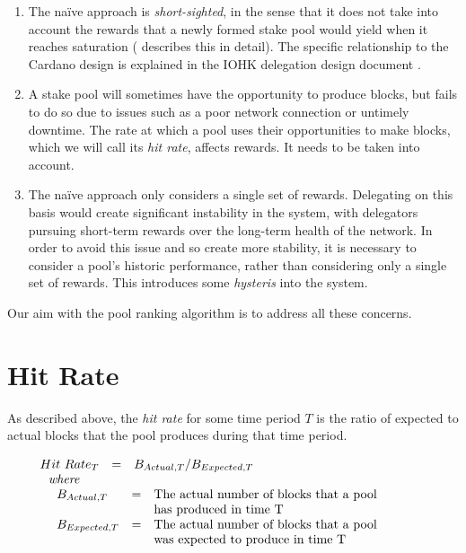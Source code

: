 \documentclass[11pt,a4paper,dvipsnames,twosided]{article}
\begin{document}
\begin{enumerate}
  \item
  The na\"{i}ve approach is \emph{short-sighted}, in the sense that it does not take into
  account the rewards that a newly formed stake pool would yield when it reaches saturation (\cite{bkks2018} describes this in detail).
  The specific relationship to the Cardano design is explained in the IOHK delegation design document \cite[Section 5.6]{delegation_design}.
  \item
    A stake pool will sometimes have the opportunity to produce blocks,
    but fails to do so due to issues such as a poor network connection or untimely downtime. The rate at
    which a pool uses their opportunities to make blocks, which we will call its \emph{hit rate}, affects rewards.
    It needs to be taken into account.
  \item
    The na\"{i}ve approach only considers a single set of rewards.  Delegating on this basis would create significant
    instability in the system, with delegators pursuing short-term rewards over the long-term health of the network.
    In order to avoid this issue and so create more stability, it is necessary to consider a pool's historic performance, rather than considering only a single set of rewards.
    This introduces some \emph{hysteris} into the system.
\end{enumerate}

Our aim with the pool ranking algorithm is to address all these concerns.

\begin{comment}
  Is this a new proposal, or just a description of the current status quo?
\end{comment}

\section{Hit Rate}

As described above, the \emph{hit rate} for some time period $T$ is the ratio of expected to actual blocks
that the pool produces during that time period.

$$
\begin{array}{l}
  \begin{array}{lclp{3in}}
    Hit~Rate_T &=& B_{Actual,T} / B_{Expected,T} \\
  ~~ \textit{where} \\
  \end{array}
\\
~~~~
  \begin{array}{lcp{3in}}
      B_{Actual,T} &=& \text{The actual number of blocks that a pool}\\
      && \text{has produced in time T}\\
      B_{Expected,T} &=& \text{The actual number of blocks that a pool}\\
      && \text{was expected to produce in time T}
  \end{array}
\end{array}
$$
\end{document}

